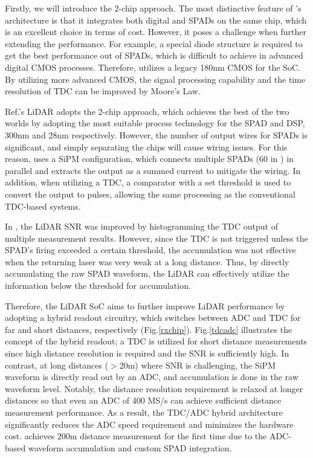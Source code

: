 \documentclass[paper]{ieice}
\begin{document}
\qquad Firstly, we will introduce the 2-chip approach.
The most distinctive feature of \cite{niclass2012100}'s architecture is that it integrates both digital and SPADs on the same chip, which is an excellent choice in terms of cost. However, it poses a challenge when further extending the performance.
For example, a special diode structure is required to get the best performance out of SPADs, which is difficult to achieve in advanced digital CMOS processes. Therefore, \cite{niclass2012100} utilizes a legacy 180nm CMOS for the SoC. By utilizing more advanced CMOS, the signal processing capability and the time resolution of TDC can be improved by Moore's Law.

Ref.\cite{yoshioka201820}'s LiDAR adopts the  2-chip approach, which achieves the best of the two worlds by adopting the most suitable process technology for the SPAD and DSP, 300nm and 28nm respectively. 
However, the number of output wires for SPADs is significant, and simply separating the chips will cause wiring issues. For this reason, \cite{yoshioka201820} uses a SiPM configuration, which connects multiple SPADs (60 in \cite{yoshioka201820}) in parallel and extracts the output as a summed current to mitigate the wiring. In addition, when utilizing a TDC, a comparator with a set threshold is used to convert the output to pulses, allowing the same processing as the conventional TDC-based systems.

In \cite{niclass2012100}, the LiDAR SNR was improved by histogramming the TDC output of multiple measurement results.
However, since the TDC is not triggered unless the SPAD's firing exceeded a certain threshold, the accumulation was not effective when the returning laser was very weak at a long distance.
Thus, by directly accumulating the raw SPAD waveform, the LiDAR can effectively utilize the information below the threshold for accumulation.

Therefore, the LiDAR SoC \cite{yoshioka201820} aims to further improve LiDAR performance by adopting a hybrid readout circuitry, which switches between ADC and TDC for far and short distances, respectively (Fig.\ref{rxchip}). 
Fig.\ref{tdcadc} illustrates the concept of the hybrid readout; a TDC is utilized for short distance measurements since high distance resolution is required and the SNR is sufficiently high. In contrast, at long distances ($>$20m) where SNR is challenging, the SiPM waveform is directly read out by an ADC, and accumulation is done in the raw waveform level. Notably, the distance resolution requirement is relaxed at longer distances so that even an ADC of 400 MS/s can achieve sufficient distance measurement performance. As a result, the TDC/ADC hybrid architecture significantly reduces the ADC speed requirement and minimizes the hardware cost. \cite{yoshioka201820} achieves 200m distance measurement for the first time due to the ADC-based waveform accumulation and custom SPAD integration.
\end{document}
